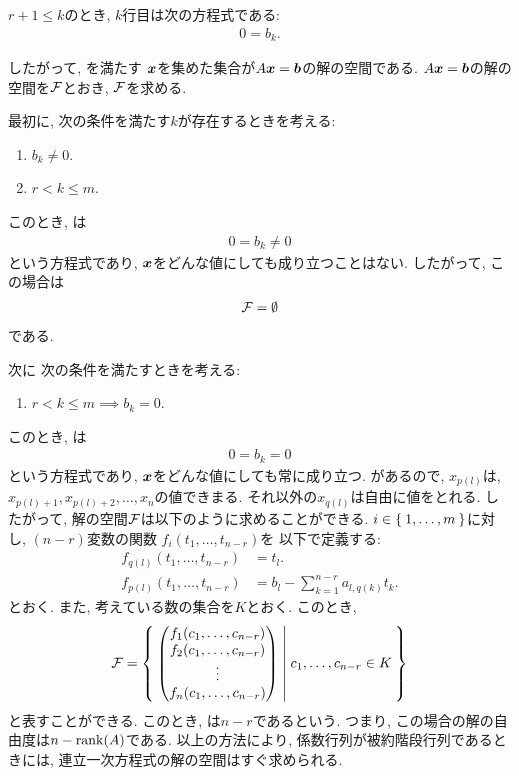 $r+1\leq k $のとき,
$k$行目は次の方程式である:
\begin{align}
  0=b_k.
  \label{eq:step:eq:2}
\end{align}

したがって, を満たす
$\boldsymbol{x}$を集めた集合が$A\boldsymbol{x}=\boldsymbol{b}$の解の空間である.
$A\boldsymbol{x}=\boldsymbol{b}$の解の空間を$\mathcal{F}$とおき,
$\mathcal{F}$を求める.

最初に,
次の条件を満たす$k$が存在するときを考える:
\begin{enumerate}
\item $b_k\neq 0$.
\item $r<k\leq m$.
\end{enumerate}
このとき, は
\begin{align*}
  0=b_k\neq 0
\end{align*}
という方程式であり,
$\boldsymbol{x}$をどんな値にしても成り立つことはない.
したがって,
この場合は
\begin{align*}
\mathcal{F}=\emptyset
\end{align*}
である.

次に
次の条件を満たすときを考える:
\begin{enumerate}
\item $r<k\leq m\implies b_k=0$.
\end{enumerate}
このとき, は
\begin{align*}
  0=b_k= 0
\end{align*}
という方程式であり,
$\boldsymbol{x}$をどんな値にしても常に成り立つ.
があるので,
$x_{p(l)}$は, $x_{p(l)+1},x_{p(l)+2},\ldots,x_{n}$の値できまる.
それ以外の$x_{q(l)}$は自由に値をとれる.
したがって, 解の空間$\mathcal{F}$は以下のように求めることができる.
$i\in \Set{1,\ldots,m}$に対し,
$(n-r)$変数の関数
$f_i(t_1,\ldots,t_{n-r})$を
以下で定義する:
\begin{align*}
  f_{q(l)}(t_1,\ldots,t_{n-r})&=t_l.\\
  f_{p(l)}(t_1,\ldots,t_{n-r})&=b_l-\sum_{k=1}^{n-r}a_{l,q(k)}t_k.
\end{align*}
とおく.
また, 考えている数の集合を$K$とおく.
このとき, 
\begin{align}
  \mathcal{F}=
  \Set{
    \begin{pmatrix}
      f_1(c_1,\ldots,c_{n-r})\\
      f_2(c_1,\ldots,c_{n-r})\\
      \vdots\\
      f_{n}(c_1,\ldots,c_{n-r})
    \end{pmatrix}
    |c_1,\ldots,c_{n-r}\in K
  }
\end{align}
と表すことができる.
このとき,
は$n-r$であるという.
つまり,
この場合の解の自由度は$n-\operatorname{rank}(A)$である.
以上の方法により,
係数行列が被約階段行列であるときには,
連立一次方程式の解の空間はすぐ求められる.



